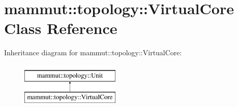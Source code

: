 \hypertarget{classmammut_1_1topology_1_1VirtualCore}{\section{mammut\-:\-:topology\-:\-:Virtual\-Core Class Reference}
\label{classmammut_1_1topology_1_1VirtualCore}
}
Inheritance diagram for mammut\-:\-:topology\-:\-:Virtual\-Core\-:\begin{figure}[H]
\begin{center}
\leavevmode
\includegraphics[height=2.000000cm]{classmammut_1_1topology_1_1VirtualCore}
\end{center}
\end{figure}
